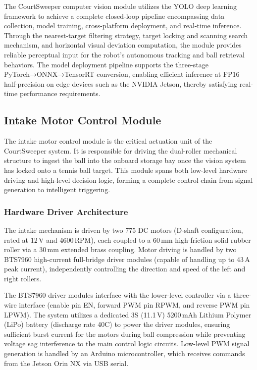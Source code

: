 The CourtSweeper computer vision module utilizes the YOLO deep learning framework to achieve a complete closed-loop pipeline encompassing data collection, model training, cross-platform deployment, and real-time inference. Through the nearest-target filtering strategy, target locking and scanning search mechanism, and horizontal visual deviation computation, the module provides reliable perceptual input for the robot's autonomous tracking and ball retrieval behaviors. The model deployment pipeline supports the three-stage PyTorch→ONNX→TensorRT conversion, enabling efficient inference at FP16 half-precision on edge devices such as the NVIDIA Jetson, thereby satisfying real-time performance requirements.

\subsection{Intake Motor Control Module}
\label{sec:motor}

The intake motor control module is the critical actuation unit of the CourtSweeper system. It is responsible for driving the dual-roller mechanical structure to ingest the ball into the onboard storage bay once the vision system has locked onto a tennis ball target. This module spans both low-level hardware driving and high-level decision logic, forming a complete control chain from signal generation to intelligent triggering.

\subsubsection{Hardware Driver Architecture}
\label{sec:motor_hw}

The intake mechanism is driven by two 775 DC motors (D-shaft configuration, rated at 12\,V and 4600\,RPM), each coupled to a 60\,mm high-friction solid rubber roller via a 30\,mm extended brass coupling. Motor driving is handled by two BTS7960 high-current full-bridge driver modules (capable of handling up to 43\,A peak current), independently controlling the direction and speed of the left and right rollers.

The BTS7960 driver modules interface with the lower-level controller via a three-wire interface (enable pin EN, forward PWM pin RPWM, and reverse PWM pin LPWM). The system utilizes a dedicated 3S (11.1\,V) 5200\,mAh Lithium Polymer (LiPo) battery (discharge rate 40C) to power the driver modules, ensuring sufficient burst current for the motors during ball compression while preventing voltage sag interference to the main control logic circuits. Low-level PWM signal generation is handled by an Arduino microcontroller, which receives commands from the Jetson Orin NX via USB serial.
